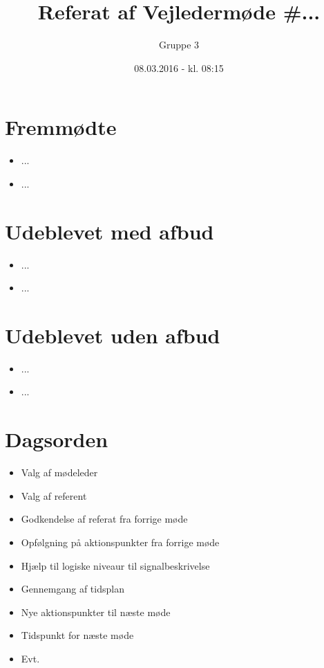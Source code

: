 \documentclass{article}
\title{Referat af Vejledermøde \#...}
\author{Gruppe 3}
\date{08.03.2016 - kl. 08:15}
\begin{document}
	\maketitle
	
	\section{Fremmødte}
	\begin{itemize}
		\item ...
		\item ...
	\end{itemize}
	
	\section{Udeblevet med afbud}
	\begin{itemize}
		\item ...
		\item ...
	\end{itemize}
	
	\section{Udeblevet uden afbud}
	\begin{itemize}
		\item ...
		\item ...
	\end{itemize}
	
	\section{Dagsorden}
	\begin{itemize}
			\item Valg af mødeleder
			\item Valg af referent
			\item Godkendelse af referat fra forrige møde 
			\item Opfølgning på aktionspunkter fra forrige møde
			\item Hjælp til logiske niveaur til signalbeskrivelse
			\item Gennemgang af tidsplan
			\item Nye aktionspunkter til næste møde
			\item Tidspunkt for næste møde
			\item Evt. 
			
	\end{itemize}
\end{document}
